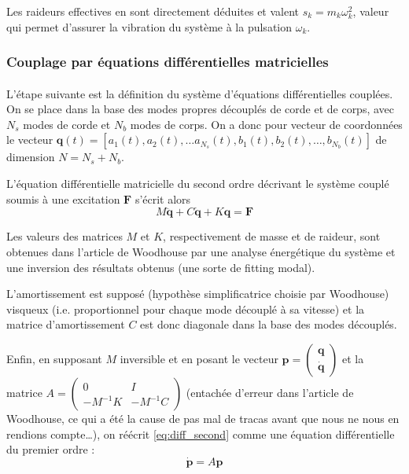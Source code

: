 \documentclass[a4paper,10pt]{article}
\begin{document}
  Les raideurs effectives en sont directement déduites et valent
\( s_k = m_k \omega{}_k^2 \), valeur qui permet d'assurer la vibration du système
à la pulsation \( \omega{}_k \).

\subsubsection{Couplage par équations différentielles matricielles}

  \paragraph{}
  L'étape suivante est la définition du système d'équations différentielles
cou\-plées. On se place dans la base des modes propres découplés de corde et de corps,
avec \( N_s \) modes de corde et \( N_b \) modes de corps. On a donc
pour vecteur de coordonnées le vecteur
  \( \bm{q}(t) = [a_1(t), a_2(t), \dots a_{N_s}(t),
    b_1(t), b_2(t), \dots, b_{N_b}(t)] \) de dimension
\( N = N_s + N_b \).

  L'équation différentielle matricielle du second ordre décrivant le système
couplé soumis à une excitation \( \bm{F} \) s'écrit alors
  \[ \label{eq:diff_second}
    M \ddot{\bm{q}} + C \dot{\bm{q}} + K \bm{q} = \bm{F} \]

  Les valeurs des matrices \( M \) et \( K \), respectivement de masse et de
raideur, sont obtenues dans l'article de Woodhouse par une analyse énergétique
du système et une inversion des résultats obtenus (une sorte de fitting
modal).

  L'amortissement est supposé (hypothèse simplificatrice choisie par Woodhouse)
visqueux (i.e. proportionnel pour chaque mode découplé à sa vitesse) et la
matrice d'amortissement \( C \) est donc diagonale dans la base des
modes découplés.

  Enfin, en supposant \( M \) inversible et en posant le vecteur
\( \bm{p} = \begin{pmatrix} \bm{q} \\ \bm{\dot{q}} \end{pmatrix} \) et la
matrice \( A = \begin{pmatrix} 0 & I \\ -M^{-1}K & -M^{-1}C \end{pmatrix} \)
(entachée d'erreur dans l'article de Woodhouse, ce qui a été la cause de pas
mal de tracas avant que nous ne nous en rendions compte\dots), on réécrit
\ref{eq:diff_second} comme une équation différentielle du premier ordre :
\[ \bm{\dot{p}} = A\bm{p} \]
\end{document}
